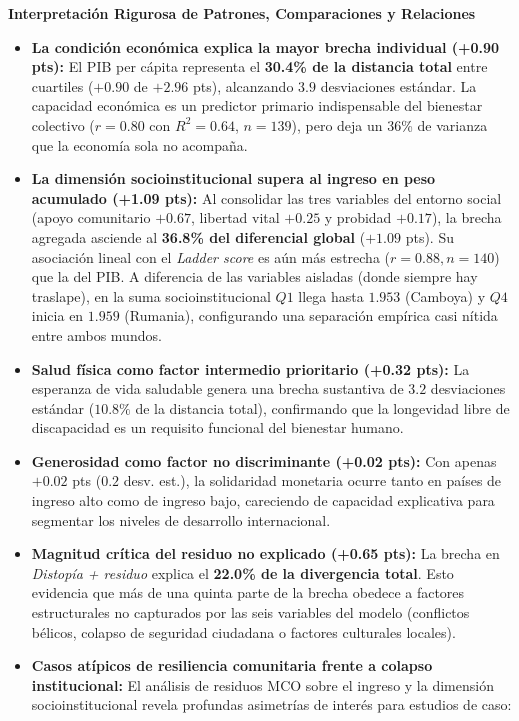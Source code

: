 \documentclass[9pt,a4paper]{article}
\newcommand{\customsubsection}[1]{%
  \vspace{0.15em}%
  {\footnotesize\bfseries\color{darkslate}#1}%
  \vspace{0.04em}\par%
}
\begin{document}
\vspace{-0.8em}

\customsubsection{Interpretación Rigurosa de Patrones, Comparaciones y Relaciones}
\begin{itemize}[leftmargin=1.1em]
    \item \textbf{La condición económica explica la mayor brecha individual (+0.90 pts):} El PIB per cápita representa el \textbf{30.4\% de la distancia total} entre cuartiles ($+0.90$ de $+2.96$ pts), alcanzando $3.9$ desviaciones estándar. La capacidad económica es un predictor primario indispensable del bienestar colectivo ($r = 0.80$ con $R^2 = 0.64$, $n=139$), pero deja un 36\% de varianza que la economía sola no acompaña.
    \item \textbf{La dimensión socioinstitucional supera al ingreso en peso acumulado (+1.09 pts):} Al consolidar las tres variables del entorno social (apoyo comunitario $+0.67$, libertad vital $+0.25$ y probidad $+0.17$), la brecha agregada asciende al \textbf{36.8\% del diferencial global} ($+1.09$ pts). Su asociación lineal con el \textit{Ladder score} es aún más estrecha ($r = 0.88, n=140$) que la del PIB. A diferencia de las variables aisladas (donde siempre hay traslape), en la suma socioinstitucional $Q1$ llega hasta $1.953$ (Camboya) y $Q4$ inicia en $1.959$ (Rumania), configurando una separación empírica casi nítida entre ambos mundos.
    \item \textbf{Salud física como factor intermedio prioritario (+0.32 pts):} La esperanza de vida saludable genera una brecha sustantiva de $3.2$ desviaciones estándar ($10.8\%$ de la distancia total), confirmando que la longevidad libre de discapacidad es un requisito funcional del bienestar humano.
    \item \textbf{Generosidad como factor no discriminante (+0.02 pts):} Con apenas $+0.02$ pts ($0.2$ desv. est.), la solidaridad monetaria ocurre tanto en países de ingreso alto como de ingreso bajo, careciendo de capacidad explicativa para segmentar los niveles de desarrollo internacional.
    \item \textbf{Magnitud crítica del residuo no explicado (+0.65 pts):} La brecha en \textit{Distopía + residuo} explica el \textbf{22.0\% de la divergencia total}. Esto evidencia que más de una quinta parte de la brecha obedece a factores estructurales no capturados por las seis variables del modelo (conflictos bélicos, colapso de seguridad ciudadana o factores culturales locales).
    \item \textbf{Casos atípicos de resiliencia comunitaria frente a colapso institucional:} El análisis de residuos MCO sobre el ingreso y la dimensión socioinstitucional revela profundas asimetrías de interés para estudios de caso:

\end{itemize}
\end{document}
